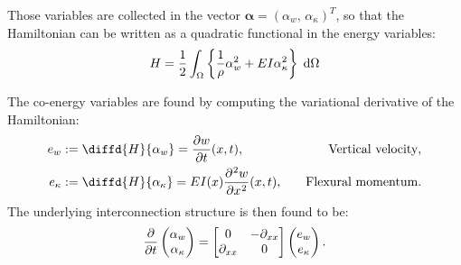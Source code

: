 Those variables are collected in the vector $\bm{\alpha} = (\alpha_{w}, \, \alpha_{\kappa})^T $, so that the Hamiltonian can be written as a quadratic functional in the energy variables: 
\begin{equation}
H = \energy{\frac{1}{\rho} \alpha_{w}^2 + EI \alpha_\kappa^2}
\end{equation}

The co-energy variables are found by computing the variational derivative of the Hamiltonian:
\begin{equation}
\begin{aligned}
e_{w} &:= \diffd{H}{\alpha_w} = \diffp{w}{t}(x,t) ,  &\quad \text{Vertical velocity}, \\
e_{\kappa} &:= \diffd{H}{\alpha_{\kappa}} =EI(x) \diffp[2]{w}{x}(x,t),  &\quad \text{Flexural momentum}. \\
\end{aligned}
\end{equation}
The underlying interconnection structure is then found to be:
\begin{equation}
\diffp{}{t}\begin{pmatrix}
\alpha_w \\ \alpha_\kappa \\
\end{pmatrix} = \begin{bmatrix}
0 & -\partial_{xx} \\
\partial_{xx} & 0 \\
\end{bmatrix} \begin{pmatrix}
e_w \\ e_\kappa \\
\end{pmatrix}.
\end{equation}

